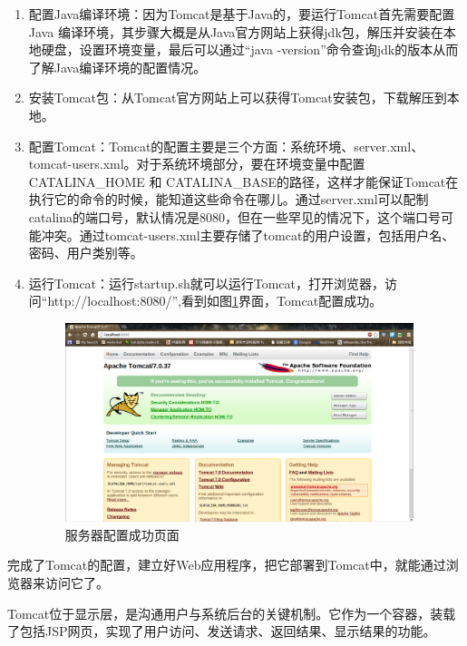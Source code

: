 \documentclass[12pt,a4paper]{article}
\newcommand{\wuhao}{\fontsize{10.5pt}{\baselineskip}\selectfont}
\begin{document}
	\begin{enumerate}[(1)]
		\item 配置{\Times Java}编译环境：因为{\Times Tomcat}是基于{\Times Java}的，要运行{\Times Tomcat}首先需要配置{\Times Java} 编译环境，其步骤大概是从{\Times Java}官方网站上获得{\Times jdk}包，解压并安装在本地硬盘，设置环境变量，最后可以通过“{\Times java -version}”命令查询{\Times jdk}的版本从而了解{\Times Java}编译环境的配置情况。
		\item 安装{\Times Tomcat}包：从{\Times Tomcat}官方网站上可以获得{\Times Tomcat}安装包，下载解压到本地。
		\item 配置{\Times Tomcat}：{\Times Tomcat}的配置主要是三个方面：系统环境、{\Times server.xml}、{\Times tomcat-users.xml}。对于系统环境部分，要在环境变量中配置{\Times CATALINA\_{}HOME}  和 {\Times CATALINA\_{}BASE}的路径，这样才能保证{\Times Tomcat}在执行它的命令的时候，能知道这些命令在哪儿。通过{\Times server.xml}可以配制{\Times catalina}的端口号，默认情况是8080，但在一些罕见的情况下，这个端口号可能冲突。通过{\Times tomcat-users.xml}主要存储了{\Times tomcat}的用户设置，包括用户名、密码、用户类别等。
		\item 运行{\Times Tomcat}：运行{\Times startup.sh}就可以运行{\Times Tomcat}，打开浏览器，访问“{\Times http://localhost:8080/}”,看到如图\ref{fig:Tomcat服务器配置成功}界面，{\Times Tomcat}配置成功。
	\begin{figure}[htbp] 
	\centering\includegraphics[width=4in]{fig/tomcatsuccess.png} 
	\caption{\wuhao {\Times Tomcat}服务器配置成功页面}\label{fig:Tomcat服务器配置成功} 
	\end{figure} 
	\end{enumerate}
	
	完成了{\Times Tomcat}的配置，建立好{\Times Web}应用程序，把它部署到{\Times Tomcat}中，就能通过浏览器来访问它了。
	
	{\Times Tomcat}位于显示层，是沟通用户与系统后台的关键机制。它作为一个容器，装载了包括{\Times JSP}网页，实现了用户访问、发送请求、返回结果、显示结果的功能。	
\end{document}
